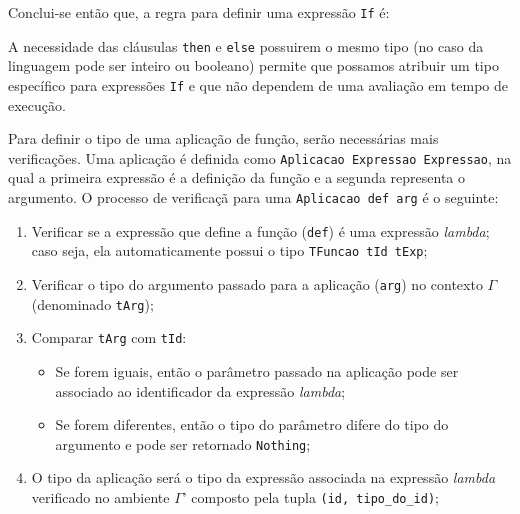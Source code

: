 \documentclass[12pt]{article}
\begin{document}
Conclui-se ent\~{a}o que, a regra para definir uma express\~{a}o
\texttt{If} \'{e}:

\begin{prooftree}
\end{prooftree}

A necessidade das cl\'{a}usulas \texttt{then} e \texttt{else} possuirem
o mesmo tipo (no caso da linguagem pode ser inteiro ou booleano) permite
que possamos atribuir um tipo espec\'{i}fico para express\~{o}es \texttt{If}
e que n\~{a}o dependem de uma avalia\c c\~{a}o em tempo de execu\c c\~{a}o.


Para definir o tipo de uma aplica\c c\~{a}o de fun\c c\~{a}o, ser\~{a}o
necess\'{a}rias mais verifica\c c\~{o}es. Uma aplica\c c\~{a}o \'{e}
definida como \texttt{Aplicacao Expressao Expressao}, na qual a primeira
express\~{a}o \'{e} a defini\c c\~{a}o da fun\c c\~{a}o e a segunda
representa o argumento. O processo de verifica\c c\~{a} para uma
\texttt{Aplicacao def arg} \'{e} o seguinte:

\begin{enumerate}

    \item Verificar se a express\~{a}o que define a fun\c c\~{a}o
    (\texttt{def}) \'{e} uma express\~{a}o \textit{lambda}; caso seja,
    ela automaticamente possui o tipo \texttt{TFuncao tId tExp};
    \item Verificar o tipo do argumento passado para a aplica\c c\~{a}o
    (\texttt{arg}) no contexto $\Gamma$ (denominado \texttt{tArg});
    \item Comparar \texttt{tArg} com \texttt{tId}:
    \begin{itemize}
        \item Se forem iguais, ent\~{a}o o par\^{a}metro passado na
        aplica\c c\~{a}o pode ser associado ao identificador da
        express\~{a}o \textit{lambda};
        \item Se forem diferentes, ent\~{a}o o tipo do par\^{a}metro
        difere do tipo do argumento e pode ser retornado \texttt{Nothing};
    \end{itemize}
    \item O tipo da aplica\c c\~{a}o ser\'{a} o tipo da express\~{a}o
    associada na express\~{a}o \textit{lambda} verificado no ambiente
    $\Gamma$' composto pela tupla \texttt{(id, tipo\_do\_id)};

\end{enumerate}
\end{document}

